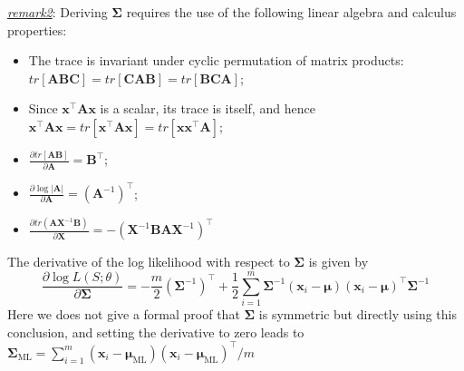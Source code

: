 \documentclass{article}
\begin{document}
\begin{itemize}
	\begin{footnotesize}
	\textit{\underline{remark2}}: Deriving $\bm{\Sigma}$ requires the use of the following linear algebra and calculus properties:	
	\begin{itemize}
	\item The trace is invariant under cyclic permutation of matrix products: $tr[\bm{A}\bm{B}\bm{C}]=tr[\bm{C}\bm{A}\bm{B}]=tr[\bm{B}\bm{C}\bm{A}]$;
	\item Since $\bm{x}^\top \bm{A} \bm{x}$ is a scalar, its trace is itself, and hence $\bm{x}^\top \bm{A} \bm{x} = tr[\bm{x}^\top \bm{A} \bm{x}] = tr[\bm{x} \bm{x}^\top \bm{A}]$;
	\item $\frac{\partial tr[\bm{A} \bm{B}]}{\partial \bm{A}} = \bm{B}^\top$;
	\item $\frac{\partial \log |\bm{A}|}{\partial \bm{A}} = (\bm{A}^{-1})^\top$;
	\item $\frac{\partial tr(\bm{A}\bm{X}^{-1}\bm{B})}{\partial \bm{X}} = -(\bm{X}^{-1} \bm{BA}\bm{X}^{-1})^\top$
	\end{itemize}
	\end{footnotesize}
	
	
	
	The derivative of the log likelihood with respect to $\bm{\Sigma}$ is given by
	\begin{equation*}
	\frac{\partial \log L(S;\theta)}{\partial \bm{\Sigma}} = -\frac{m}{2} (\bm{\Sigma}^{-1})^\top + \frac{1}{2} \sum_{i=1}^m  \bm{\Sigma}^{-1} (\bm{x}_i - \bm{\mu})(\bm{x}_i - \bm{\mu})^\top \bm{\Sigma}^{-1}
	\end{equation*}
Here we does not give a formal proof that $\bm{\Sigma}$ is symmetric but directly using this conclusion, and setting the derivative to zero leads to $\bm{\Sigma}_{\mathrm{ML}} = \sum_{i=1}^m (\bm{x}_i - \bm{\mu}_{\mathrm{ML}})(\bm{x}_i - \bm{\mu}_{\mathrm{ML}})^\top/m $
		

\end{itemize}
\end{document}
